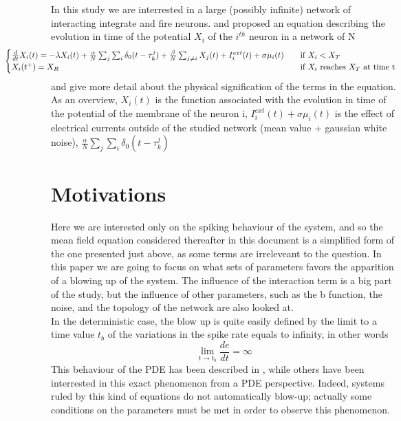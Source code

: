	In this study we are interrested in a large (possibly infinite) network of interacting integrate and fire neurons. \cite{lewis_dynamics_2003} and \cite{ostojic_synchronization_2009} proposed an equation describing the evolution in time of the potential $X_i$ of the $i^{th}$ neuron in a network of N
		\begin{equation}
			\hspace*{-2cm} \begin{cases}
				\frac{d}{dt}X_i(t)=-\lambda X_i(t)+\frac{\alpha}{N}\sum_j\sum_i\delta_0(t-\tau_k^j)+\frac{\beta}{N}\sum_{j\neq i}X_j(t)+I_i^{ext}(t)+\sigma\mu_i(t) &\quad\text{if }X_i<X_T\\
				X_i(t^+)=X_R & \quad\text{if }X_i\text{ reaches }X_T\text{ at time t}\\
			\end{cases}
		\end{equation}
	\cite{ostojic_synchronization_2009} and \cite{delarue:hal-00747565} give more detail about the physical signification of the terms in the equation. As an overview, $X_i(t)$ is the function associated with the evolution in time of the potential of the membrane of the neuron i, $I_i^{ext}(t)+\sigma\mu_i(t)$ is the effect of electrical currents outside of the studied network (mean value + gaussian white noise), $\frac{\alpha}{N}\sum_j\sum_i\delta_0(t-\tau_k^j)$ 

	\section{Motivations}
	Here we are interested only on the spiking behaviour of the system, and so the mean field equation considered thereafter in this document is a simplified form of the one presented just above, as some terms are irreleveant to the question.
	In this paper we are going to focus on what sets of parameters favors the apparition of a blowing up of the system. The influence of the interaction term is a big part of the study, but the influence of other parameters, such as the b function, the noise, and the topology of the network are also looked at.\\
	In the deterministic case, the blow up is quite easily defined by the limit to a time value $t_b$ of the variations in the spike rate equals to infinity, in other words
	\begin{equation}
		\lim_{t\rightarrow t_b}\frac{de}{dt}=\infty
	\end{equation}
	This behaviour of the PDE has been described in \cite{delarue:hal-00747565}, while others have been interrested in this exact phenomenon from a PDE perspective. Indeed, systems ruled by this kind of equations do not automatically blow-up; actually some conditions on the parameters must be met in order to observe this phenomenon.

